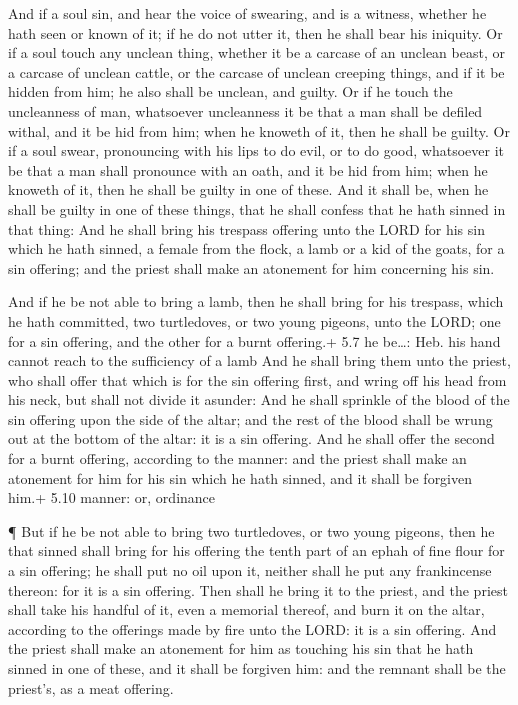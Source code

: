  And if a soul sin, and hear the voice of swearing, and is a
witness, whether he hath seen or known of it; if he do not utter it,
then he shall bear his iniquity.  Or if a soul touch any
unclean thing, whether it be a carcase of an unclean beast, or a carcase
of unclean cattle, or the carcase of unclean creeping things, and if it
be hidden from him; he also shall be unclean, and guilty. 
Or if he touch the uncleanness of man, whatsoever uncleanness it be that
a man shall be defiled withal, and it be hid from him; when he knoweth
of it, then he shall be guilty.  Or if a soul swear,
pronouncing with his lips to do evil, or to do good, whatsoever it be
that a man shall pronounce with an oath, and it be hid from him; when he
knoweth of it, then he shall be guilty in one of these.  And
it shall be, when he shall be guilty in one of these things, that he
shall confess that he hath sinned in that thing:  And he
shall bring his trespass offering unto the LORD for his sin which he
hath sinned, a female from the flock, a lamb or a kid of the goats, for
a sin offering; and the priest shall make an atonement for him
concerning his sin.

 And if he be not able to bring a lamb, then he shall bring
for his trespass, which he hath committed, two turtledoves, or two young
pigeons, unto the LORD; one for a sin offering, and the other for a
burnt offering.+ 5.7 he be\ldots: Heb. his hand cannot reach to the
sufficiency of a lamb  And he shall bring them unto the
priest, who shall offer that which is for the sin offering first, and
wring off his head from his neck, but shall not divide it asunder:
 And he shall sprinkle of the blood of the sin offering upon
the side of the altar; and the rest of the blood shall be wrung out at
the bottom of the altar: it is a sin offering.  And he
shall offer the second for a burnt offering, according to the manner:
and the priest shall make an atonement for him for his sin which he hath
sinned, and it shall be forgiven him.+ 5.10 manner: or, ordinance

 ¶ But if he be not able to bring two turtledoves, or two
young pigeons, then he that sinned shall bring for his offering the
tenth part of an ephah of fine flour for a sin offering; he shall put no
oil upon it, neither shall he put any frankincense thereon: for it is a
sin offering.  Then shall he bring it to the priest, and
the priest shall take his handful of it, even a memorial thereof, and
burn it on the altar, according to the offerings made by fire unto the
LORD: it is a sin offering.  And the priest shall make an
atonement for him as touching his sin that he hath sinned in one of
these, and it shall be forgiven him: and the remnant shall be the
priest's, as a meat offering.

